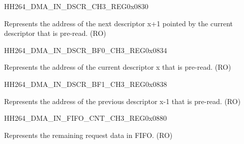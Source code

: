 \begin{register}{H}{H264\_DMA\_IN\_DSCR\_CH3\_REG}{0x0830}\label{regdesc:H264DMAINDSCRCH3REG}
%
\regnewline%
\begin{regdesc}\begin{reglist}
\label{fielddesc:H264DMAINLINKDSCRCH3}\item [H264\_DMA\_INLINK\_DSCR\_CH3] Represents the address of the next descriptor x+1 pointed by the current descriptor that is pre-read. (RO)
\end{reglist}\end{regdesc}
\end{register}


\begin{register}{H}{H264\_DMA\_IN\_DSCR\_BF0\_CH3\_REG}{0x0834}\label{regdesc:H264DMAINDSCRBF0CH3REG}
%
\regnewline%
\begin{regdesc}\begin{reglist}
\label{fielddesc:H264DMAINLINKDSCRBF0CH3}\item [H264\_DMA\_INLINK\_DSCR\_BF0\_CH3] Represents the address of the current descriptor x that is pre-read. (RO)
\end{reglist}\end{regdesc}
\end{register}


\begin{register}{H}{H264\_DMA\_IN\_DSCR\_BF1\_CH3\_REG}{0x0838}\label{regdesc:H264DMAINDSCRBF1CH3REG}
%
\regnewline%
\begin{regdesc}\begin{reglist}
\label{fielddesc:H264DMAINLINKDSCRBF1CH3}\item [H264\_DMA\_INLINK\_DSCR\_BF1\_CH3] Represents the address of the previous descriptor x-1 that is pre-read. (RO)
\end{reglist}\end{regdesc}
\end{register}

\begin{register}{H}{H264\_DMA\_IN\_FIFO\_CNT\_CH3\_REG}{0x0880}\label{regdesc:H264DMAINFIFOCNTCH3REG}
%
%
\regnewline%
\begin{regdesc}\begin{reglist}
\label{fielddesc:H264DMAINCMDFIFOINFIFOCNTCH3}\item [H264\_DMA\_IN\_CMDFIFO\_INFIFO\_CNT\_CH3] Represents the remaining request data in FIFO. (RO)
\end{reglist}\end{regdesc}
\end{register}


